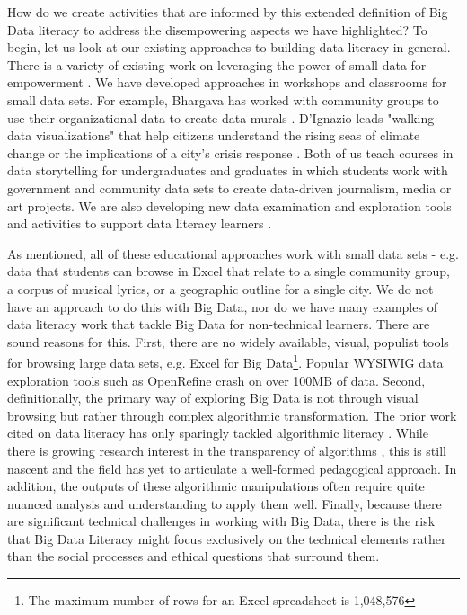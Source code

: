 \documentclass{sig-alternate}
\begin{document}
How do we create activities that are informed by this extended definition of Big Data literacy to address the disempowering aspects we have highlighted?  To begin, let us look at our existing approaches to building data literacy in general. There is a variety of existing work on leveraging the power of small data for empowerment \cite{warren_promise_2013}. We have developed approaches in workshops and classrooms for small data sets. For example, Bhargava has worked with community groups to use their organizational data to create data murals \cite{bhargava_data_murals}. D'Ignazio leads "walking data visualizations" that help citizens understand the rising seas of climate change \cite{dignazio_coastline_2015} or the implications of a city's crisis response \cite{dignazio_breaths_2008}. Both of us teach courses in data storytelling for undergraduates and graduates in which students work with government and community data sets to create data-driven journalism, media or art projects. We are also developing new data examination and exploration tools and activities to support data literacy learners \cite{bhargava_designing_2015}.

As mentioned, all of these educational approaches work with small data sets - e.g. data that students can browse in Excel that relate to a single community group, a corpus of musical lyrics, or a geographic outline for a single city. We do not have an approach to do this with Big Data, nor do we have many examples of data literacy work that tackle Big Data for non-technical learners. There are sound reasons for this. First, there are no widely available, visual, populist tools for browsing large data sets, e.g. Excel for Big Data\footnote{The maximum number of rows for an Excel spreadsheet is 1,048,576}. Popular WYSIWIG data exploration tools such as OpenRefine crash on over 100MB of data. Second, definitionally, the primary way of exploring Big Data is not through visual browsing but rather through complex algorithmic transformation. The prior work cited on data literacy has only sparingly tackled algorithmic literacy \cite{hamilton_path_2014}. While there is growing research interest in the transparency of algorithms \cite{sandvig_auditing_2014} \cite{diakopoulos_algorithmic_2015}, this is still nascent and the field has yet to articulate a well-formed pedagogical approach. In addition, the outputs of these algorithmic manipulations often require quite nuanced analysis and understanding to apply them well.  Finally, because there are significant technical challenges in working with Big Data, there is the risk that Big Data Literacy might focus exclusively on the technical elements rather than the social processes and ethical questions that surround them.
\end{document}
